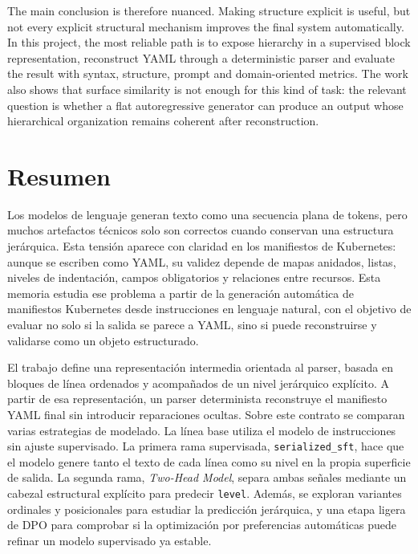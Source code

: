 The main conclusion is therefore nuanced. Making structure explicit is useful, but not every explicit structural mechanism improves the final system automatically. In this project, the most reliable path is to expose hierarchy in a supervised block representation, reconstruct YAML through a deterministic parser and evaluate the result with syntax, structure, prompt and domain-oriented metrics. The work also shows that surface similarity is not enough for this kind of task: the relevant question is whether a flat autoregressive generator can produce an output whose hierarchical organization remains coherent after reconstruction.


\newpage
\section*{Resumen}
\label{sec::resumen}


Los modelos de lenguaje generan texto como una secuencia plana de tokens, pero muchos artefactos técnicos solo son correctos cuando conservan una estructura jerárquica. Esta tensión aparece con claridad en los manifiestos de Kubernetes: aunque se escriben como YAML, su validez depende de mapas anidados, listas, niveles de indentación, campos obligatorios y relaciones entre recursos. Esta memoria estudia ese problema a partir de la generación automática de manifiestos Kubernetes desde instrucciones en lenguaje natural, con el objetivo de evaluar no solo si la salida se parece a YAML, sino si puede reconstruirse y validarse como un objeto estructurado.

El trabajo define una representación intermedia orientada al parser, basada en bloques de línea ordenados y acompañados de un nivel jerárquico explícito. A partir de esa representación, un parser determinista reconstruye el manifiesto YAML final sin introducir reparaciones ocultas. Sobre este contrato se comparan varias estrategias de modelado. La línea base utiliza el modelo de instrucciones sin ajuste supervisado. La primera rama supervisada, \texttt{serialized\_sft}, hace que el modelo genere tanto el texto de cada línea como su nivel en la propia superficie de salida. La segunda rama, \textit{Two-Head Model}, separa ambas señales mediante un cabezal estructural explícito para predecir \texttt{level}. Además, se exploran variantes ordinales y posicionales para estudiar la predicción jerárquica, y una etapa ligera de DPO para comprobar si la optimización por preferencias automáticas puede refinar un modelo supervisado ya estable.

